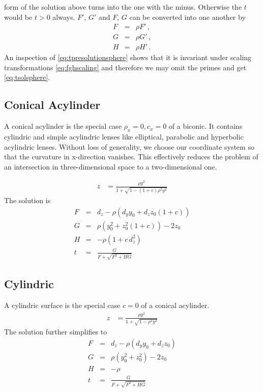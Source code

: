 \documentclass[12pt,a4paper,twoside,openright,BCOR10mm,headsepline,titlepage,abstracton,chapterprefix,final]{scrreprt}
\begin{document}
form of the solution above turns into the one with the minus. Otherwise the $t$ would be
$t>0$ always. $F'$, $G'$ and $F$, $G$ can be converted into one another by
\begin{subequations}
\label{eq:fghscaling}
\begin{eqnarray}
 F &=& \rho F'\,,\\
 G &=& \rho G'\,,\\
 H &=& \rho H'\,.
\end{eqnarray}
\end{subequations}
An inspection of \eqref{eq:tpresolutionsphere} shows that it is invariant under scaling transformations \eqref{eq:fghscaling}
and therefore we may omit the primes and get \eqref{eq:tsolsphere}.
\fi

\subsection{Conical Acylinder}
A conical acylinder is the special case $\rho_x=0, c_x=0$ of a biconic. It contains cylindric and simple acylindric lenses like elliptical, parabolic and hyperbolic acylindric lenses.
Without loss of generality, we choose our coordinate system so that the curvature in x-direction vanishes.
This effectively reduces the problem of an intersection in three-dimensional space to a two-dimensional one.

\begin{align}
 z &= \frac{ \rho y^2}{1 + \sqrt{1 - (1+c) \rho^2 y^2}}
\end{align}
The solution is
\begin{eqnarray}
   F &=& d_z - \rho \left(  d_y y_0 + d_z z_0 (1+c) \right) \\
   G &=& \rho ( y_0^2 + z_0^2 (1+c)) - 2 z_0 \\
   H &=& - \rho ( 1 + c \, d_z^2 ) \\
   t &=& \frac{G}{ F + \sqrt{F^2 + H G} }
\end{eqnarray}


\subsection{Cylindric}
A cylindric surface is the special case $c = 0$ of a conical acylinder.
\begin{align}
 z &= \frac{ \rho y^2}{1 + \sqrt{1 - \rho^2 y^2}}
\end{align}
The solution further simplifies to
\begin{eqnarray}
   F &=& d_z - \rho \left(  d_y y_0 + d_z z_0  \right) \\
   G &=& \rho ( y_0^2 + z_0^2 ) - 2 z_0 \\
   H &=& - \rho \\
   t &=& \frac{G}{ F + \sqrt{F^2 + H G} }
\end{eqnarray}
\end{document}
